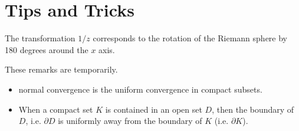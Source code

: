 \chapter{Tips and Tricks}


\begin{observation}
	The transformation $ 1/z $ corresponds to the rotation of the Riemann sphere by 180 degrees around the $ x $ axis.
\end{observation}


\begin{remark}
	These remarks are temporarily.
	\begin{itemize}
		\item normal convergence is the uniform convergence in compact subsets.
		\item When a compact set $ K $ is contained in an open set $ D $, then the boundary of $ D $, i.e. $ \partial D $ is uniformly away from the boundary of $ K $ (i.e. $ \partial K $).
	\end{itemize}
\end{remark}